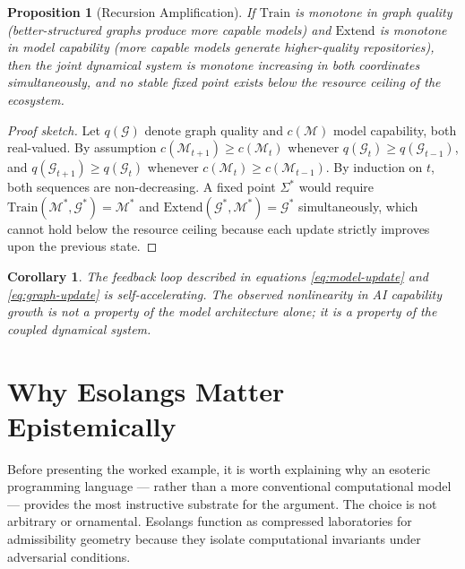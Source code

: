 \documentclass[11pt]{article}
\newtheorem{proposition}[theorem]{Proposition}
\newtheorem{corollary}[theorem]{Corollary}
\begin{document}
\begin{proposition}[Recursion Amplification]
If $\mathrm{Train}$ is monotone in graph quality (better-structured graphs
produce more capable models) and $\mathrm{Extend}$ is monotone in model
capability (more capable models generate higher-quality repositories), then the
joint dynamical system is monotone increasing in both coordinates simultaneously,
and no stable fixed point exists below the resource ceiling of the ecosystem.
\end{proposition}

\begin{proof}[Proof sketch]
Let $q(\mathcal{G})$ denote graph quality and $c(\mathcal{M})$ model capability,
both real-valued. By assumption $c(\mathcal{M}_{t+1}) \geq c(\mathcal{M}_t)$
whenever $q(\mathcal{G}_t) \geq q(\mathcal{G}_{t-1})$, and $q(\mathcal{G}_{t+1})
\geq q(\mathcal{G}_t)$ whenever $c(\mathcal{M}_t) \geq c(\mathcal{M}_{t-1})$.
By induction on $t$, both sequences are non-decreasing. A fixed point
$\Sigma^*$ would require $\mathrm{Train}(\mathcal{M}^*, \mathcal{G}^*) =
\mathcal{M}^*$ and $\mathrm{Extend}(\mathcal{G}^*, \mathcal{M}^*) =
\mathcal{G}^*$ simultaneously, which cannot hold below the resource ceiling
because each update strictly improves upon the previous state.
\end{proof}

\begin{corollary}
The feedback loop described in equations \eqref{eq:model-update} and
\eqref{eq:graph-update} is self-accelerating. The observed nonlinearity in
AI capability growth is not a property of the model architecture alone; it
is a property of the coupled dynamical system.
\end{corollary}


\section{Why Esolangs Matter Epistemically}

Before presenting the worked example, it is worth explaining why an esoteric
programming language --- rather than a more conventional computational model ---
provides the most instructive substrate for the argument. The choice is not
arbitrary or ornamental. Esolangs function as compressed laboratories for
admissibility geometry because they isolate computational invariants under
adversarial conditions.
\end{document}
